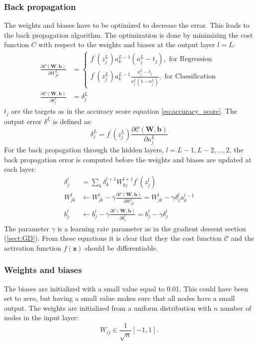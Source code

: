 \documentclass[12pt,a4paper,english]{article}
\begin{document}
\subsubsection{Back propagation}
\label{subsect:back_prop}
The weights and biases have to be optimized to decrease the error. This leads to the back propagation algorithm. The optimization is done by minimizing the cost function $C$ with respect to the weights and biases at the output layer $l=L$:
\begin{align*}
\frac{\partial \mathcal{C}(\textbf{W},\textbf{b})}{\partial W^L_{jk}}&=\begin{cases*}
f^{\prime}(z^L_j)a_k^{L-1}(a^L_j-t_j), \text{ for Regression}\\
f^{\prime}(z^L_j)a_k^{L-1}\frac{a^L_j-t_j}{a^L_j(1-a^L_j)}, \text{ for Classification}
\end{cases*}\\
\frac{\partial \mathcal{C}(\textbf{W},\textbf{b})}{\partial b^L_{j}}&=\delta_j^L
\end{align*}
$t_j$ are the targets as in the accuracy score equation \ref{eq:accuracy_score}. The output error $\delta^L$ is defined as:
\begin{equation*}
\delta_j^L=f^{\prime}(z^L_j)\frac{\partial \mathcal{C}(\textbf{W},\textbf{b})}{\partial a^L_j}
\end{equation*}
For the back propagation through the hidden layers, $l=L-1,L-2,...,2$, the back propagation error is computed before the weights and biases are updated at each layer:
\begin{align*}
\delta_j^l&=\sum_{k}\delta_k^{l+1}W_{kj}^{l+1}f^{\prime}(z^l_j)\\
W_{jk}^l&\leftarrow W_{jk}^l-\gamma\frac{\partial \mathcal{C}(\textbf{W},\textbf{b})}{\partial W_{jk}^l}= W_{jk}^l -\gamma \delta_j^la_k^{l-1} \\
b^l_j&\leftarrow b^l_j-\gamma\frac{\partial \mathcal{C}(\textbf{W},\textbf{b})}{\partial b_j^l}=b^l_j-\gamma\delta_j^l
\end{align*}
The parameter $\gamma$ is a learning rate parameter as in the gradient descent section (\ref{sect:GD}). From these equations it is clear that they the cost function $\mathcal{C}$ and the activation function $f(\textbf{z})$ should be differentiable.

\subsubsection{Weights and biases}
\label{subsect:W_b}
The biases are initialized with a small value equal to 0.01. This could have been set to zero, but having a small value makes sure that all nodes have a small output. The weights are initialized from a uniform distribution with $n$ number of nodes in the input layer: \[W_{ij}\in\frac{1}{\sqrt{n}}[-1,1].\]
\end{document}
